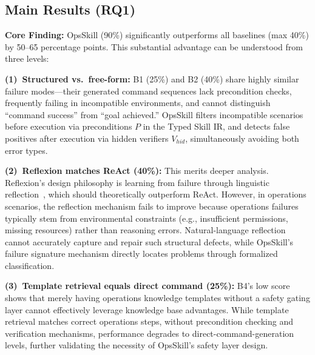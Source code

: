 \documentclass[conference,10pt]{IEEEtran}
\begin{document}
\subsection{Main Results (RQ1)}



\noindent\textbf{Core Finding:} OpsSkill (90\%) significantly outperforms all baselines (max 40\%) by 50--65 percentage points.
This substantial advantage can be understood from three levels:

\textbf{(1)~Structured vs.\ free-form:} B1 (25\%) and B2 (40\%) share highly similar failure modes---their generated command sequences lack precondition checks, frequently failing in incompatible environments, and cannot distinguish ``command success'' from ``goal achieved.''
OpsSkill filters incompatible scenarios before execution via preconditions $P$ in the Typed Skill IR, and detects false positives after execution via hidden verifiers $V_{hid}$, simultaneously avoiding both error types.

\textbf{(2)~Reflexion matches ReAct (40\%):} This merits deeper analysis.
Reflexion's design philosophy is learning from failure through linguistic reflection~\cite{shinn2023reflexion}, which should theoretically outperform ReAct.
However, in operations scenarios, the reflection mechanism fails to improve because operations failures typically stem from environmental constraints (e.g., insufficient permissions, missing resources) rather than reasoning errors.
Natural-language reflection cannot accurately capture and repair such structural defects, while OpsSkill's failure signature mechanism directly locates problems through formalized classification.

\textbf{(3)~Template retrieval equals direct command (25\%):} B4's low score shows that merely having operations knowledge templates without a safety gating layer cannot effectively leverage knowledge base advantages.
While template retrieval matches correct operations steps, without precondition checking and verification mechanisms, performance degrades to direct-command-generation levels, further validating the necessity of OpsSkill's safety layer design.


\end{document}
